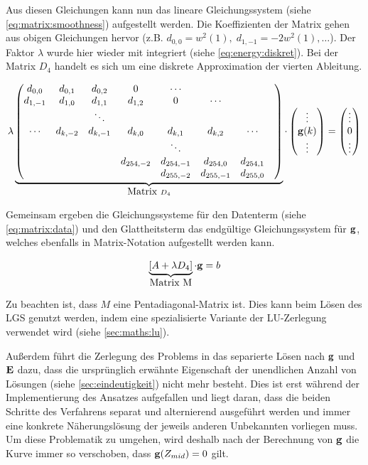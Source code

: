 Aus diesen Gleichungen kann nun das lineare Gleichungssystem (siehe \autoref{eq:matrix:smoothness}) aufgestellt werden. Die  Koeffizienten der Matrix gehen aus obigen Gleichungen hervor (z.B. $d_{0,0} = w^2(1), \; d_{1,-1} = -2w^2(1), \dots$). Der Faktor $\lambda$ wurde hier wieder mit integriert (siehe \autoref{eq:energy:diskret}). Bei der Matrix $D_4$ handelt es sich um eine diskrete Approximation der vierten Ableitung.

\begin{align}
\label{eq:matrix:smoothness}
\lambda
\underbrace{
\begin{pmatrix}
d_{0,0} & d_{0,1} & d_{0,2} & 0 &\cdots\\
d_{1,-1} & d_{1,0} & d_{1,1} & d_{1,2} & 0 &\cdots\\
&  & \ddots &  \\
\cdots  & d_{k,-2} & d_{k,-1} & d_{k,0}&d_{k,1} &d_{k,2} & \cdots\\
&&&&\ddots&&&\\
&&&d_{254,-2}&d_{254,-1}&d_{254,0}&d_{254,1}\\
&&&&d_{255,-2}&d_{255,-1}&d_{255,0}\\
\end{pmatrix}}_{\mbox{Matrix } D_4}
\cdot
\begin{pmatrix}
\vdots\\
\mathbf g(k)\\
\vdots
\end{pmatrix}
= 
\begin{pmatrix}
\vdots\\
0\\
\vdots
\end{pmatrix}
\end{align}


Gemeinsam ergeben die Gleichungssysteme für den Datenterm (siehe \autoref{eq:matrix:data}) und den Glattheitsterm das endgültige Gleichungssystem für $\mathbf g$, welches ebenfalls in Matrix-Notation aufgestellt werden kann.
 
\begin{align}
\label{eq:g:lgs}
\underbrace{[A+\lambda D_4]}_{\mbox{Matrix M}}\cdot \mathbf g = b
\end{align}

Zu beachten ist, dass $M$ eine \gls{Pentadiagonal-Matrix} ist. Dies kann beim Lösen des \gls{LGS} genutzt werden, indem eine spezialisierte Variante der LU-Zerlegung verwendet wird (siehe \autoref{sec:maths:lu}).

Außerdem führt die Zerlegung des Problems in das separierte Lösen nach $\mathbf g$ und $\mathbf E$ dazu, dass die ursprünglich erwähnte Eigenschaft der unendlichen Anzahl von Lösungen (siehe \autoref{sec:eindeutigkeit}) nicht mehr besteht. Dies ist erst während der Implementierung des Ansatzes aufgefallen und liegt daran, dass die beiden Schritte des Verfahrens separat und alternierend ausgeführt werden und immer eine konkrete Näherungslösung der jeweils anderen Unbekannten vorliegen muss.
Um diese Problematik zu umgehen, wird deshalb nach der Berechnung von $\mathbf g$ die Kurve immer so verschoben, dass $\mathbf g(Z_{mid}) = 0$ gilt. 

